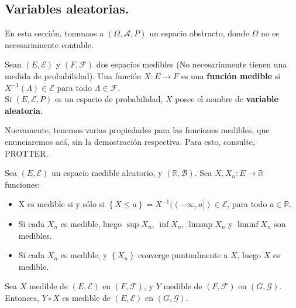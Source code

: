 



\subsection{Variables aleatorias.}

En esta sección, tommaos a $(\Omega, \mathcal{A}, P)$ un espacio abstracto, donde $\Omega$ no es necesariamente contable.

\begin{boxDef}
	Sean $(E, \mathcal{E})$ y $(F, \mathcal{F})$ dos espacios medibles (No necesariamente tienen una medida de probabilidad). Una función $X: E \rightarrow F$ es una \textbf{función medible} si $X^{-1}(\Lambda) \in \mathcal{E}$ para todo $\Lambda \in \mathcal{F}$.\\

	Si $(E, \mathcal{E}, P)$ es un espacio de probabilidad, $X$ posee el nombre de \textbf{variable aleatoria}.
\end{boxDef}

Nuevamente, tenemos varias propiedades para las funciones medibles, que enunciaremos acá, sin la demostración respectiva. Para esto, consulte, PROTTER.

\begin{coro}
	Sea $(E, \mathcal{E})$ un espacio medible aleatorio, y $(\mathbb{R}, \mathcal{B})$. Sea $X, X_n: E \rightarrow \mathbb{R}$ funciones:

	\begin{itemize}
		\item X es medible si y sólo si $\left\{ X \leq a \right\} = X^{-1}( (-\infty, a] ) \in \mathcal{E}$, para todo $a \in \mathbb{R}$.
		\item Si cada $X_n$ es medible, luego $\sup X_n$, $\inf X_n$, $\limsup X_n$ y $\liminf X_n$ son medibles.
		\item Si cada $X_n$ es medible, y $\left\{X_n\right\}$ converge puntualmente a $X$, luego $X$ es medible. 
	\end{itemize}

\end{coro}

\begin{theorem} 
	Sea $X$ medible de $(E, \mathcal{E})$ en $(F, \mathcal{F})$, y $Y$ medible de $(F, \mathcal{F})$ en $(G, \mathcal{G})$. Entonces, $Y \circ X$ es medible de $(E, \mathcal{E})$ en $(G, \mathcal{G})$.
\end{theorem}


